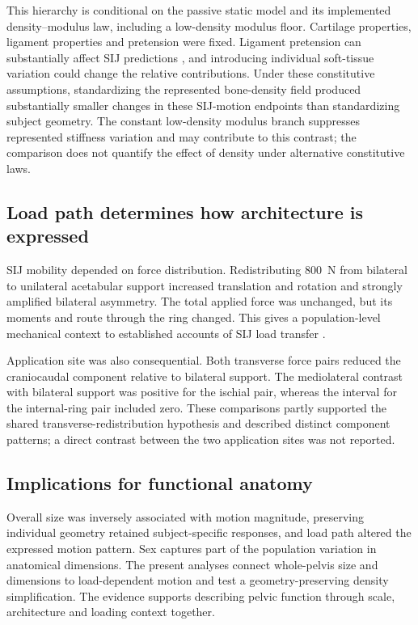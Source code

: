 This hierarchy is conditional on the passive static model and its implemented density--modulus law, including a low-density modulus floor. Cartilage properties, ligament properties and pretension were fixed. Ligament pretension can substantially affect SIJ predictions \citep{Heyland2025}, and introducing individual soft-tissue variation could change the relative contributions. Under these constitutive assumptions, standardizing the represented bone-density field produced substantially smaller changes in these SIJ-motion endpoints than standardizing subject geometry. The constant low-density modulus branch suppresses represented stiffness variation and may contribute to this contrast; the comparison does not quantify the effect of density under alternative constitutive laws.

\subsection*{Load path determines how architecture is expressed}
SIJ mobility depended on force distribution. Redistributing 800~N from bilateral to unilateral acetabular support increased translation and rotation and strongly amplified bilateral asymmetry. The total applied force was unchanged, but its moments and route through the ring changed. This gives a population-level mechanical context to established accounts of SIJ load transfer \citep{Snijders1993,Vleeming2012}.

Application site was also consequential. Both transverse force pairs reduced the craniocaudal component relative to bilateral support. The mediolateral contrast with bilateral support was positive for the ischial pair, whereas the interval for the internal-ring pair included zero. These comparisons partly supported the shared transverse-redistribution hypothesis and described distinct component patterns; a direct contrast between the two application sites was not reported.

\subsection*{Implications for functional anatomy}
Overall size was inversely associated with motion magnitude, preserving individual geometry retained subject-specific responses, and load path altered the expressed motion pattern. Sex captures part of the population variation in anatomical dimensions. The present analyses connect whole-pelvis size and dimensions to load-dependent motion and test a geometry-preserving density simplification. The evidence supports describing pelvic function through scale, architecture and loading context together.

